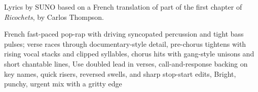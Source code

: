 
\begin{notes}
Lyrics by SUNO based on a French translation of part of the first chapter of \emph{Ricochets}, by Carlos Thompson.
\end{notes}
\begin{style}
French fast-paced pop-rap with driving syncopated percussion and tight bass pulses; verse races through documentary-style detail, pre-chorus tightens with rising vocal stacks and clipped syllables, chorus hits with gang-style unisons and short chantable lines, Use doubled lead in verses, call-and-response backing on key names, quick risers, reversed swells, and sharp stop-start edits, Bright, punchy, urgent mix with a gritty edge
\end{style}
